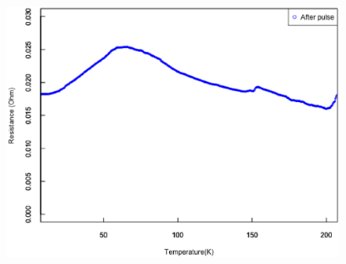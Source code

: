 \begin{figure}[!h]
\begin{minipage}{0.5\hsize}
 \end{minipage}
 \begin{minipage}{0.5\hsize}
     \begin{center}
   \includegraphics[width=\hsize]{results_discussions/181228_after_pulse2.eps}
  \end{center}
  \caption{}
  \label{fig:181228_after_pulse2}
   \end{minipage}
\end{figure}


